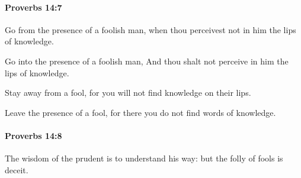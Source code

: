 		\paragraph{Proverbs 14:7} %
			\label{PROVERBS-14-7}

			Go from the presence of a foolish man, when thou perceivest not in him the lips of knowledge.

			\begin{versebox}
					\item[BHS] 
					\item[ASV] Go into the presence of a foolish man, And thou shalt not perceive in him the lips of knowledge.
					\item[NIV] Stay away from a fool, for you will not find knowledge on their lips.
					\item[NRSV] Leave the presence of a fool, for there you do not find words of knowledge.
			\end{versebox}

		\paragraph{Proverbs 14:8} %
			\label{PROVERBS-14-8}

			The wisdom of the prudent is to understand his way: but the folly of fools is deceit.

